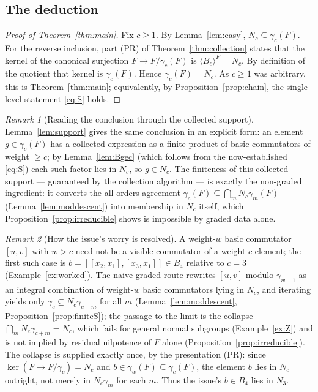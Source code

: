 \documentclass{amsart}
\theoremstyle{definition}
\theoremstyle{remark}
\newtheorem{remark}{Remark}
\begin{document}
\subsection*{The deduction}

\begin{proof}[Proof of Theorem~\ref{thm:main}]
Fix $c\ge1$. By Lemma~\ref{lem:easy}, $N_c\subseteq\gamma_c(F)$. For the reverse inclusion,
part (PR) of Theorem~\ref{thm:collection} states that the kernel of the canonical surjection
$F\to F/\gamma_c(F)$ is $\langle B_c\rangle^F=N_c$. By definition of the quotient that kernel is
$\gamma_c(F)$. Hence $\gamma_c(F)=N_c$. As $c\ge1$ was arbitrary, this is
Theorem~\ref{thm:main}; equivalently, by Proposition~\ref{prop:chain}, the single-level
statement \eqref{eq:S} holds.
\end{proof}

\begin{remark}[Reading the conclusion through the collected support]\label{rem:support-read}
Lemma~\ref{lem:support} gives the same conclusion in an explicit form: an element
$g\in\gamma_c(F)$ has a collected expression as a finite product of basic commutators of weight
$\ge c$; by Lemma~\ref{lem:Bgec} (which follows from the now-established \eqref{eq:S}) each such
factor lies in $N_c$, so $g\in N_c$. The finiteness of this collected support --- guaranteed by
the collection algorithm --- is exactly the non-graded ingredient: it converts the
all-orders agreement $\gamma_c(F)\subseteq\bigcap_m N_c\gamma_m(F)$ (Lemma~\ref{lem:moddescent})
into membership in $N_c$ itself, which Proposition~\ref{prop:irreducible} shows is impossible by
graded data alone.
\end{remark}

\begin{remark}[How the issue's worry is resolved]\label{rem:issue}
A weight-$w$ basic commutator $[u,v]$ with $w>c$ need not be a visible commutator of a
weight-$c$ element; the first such case is $b=[[x_2,x_1],[x_3,x_1]]\in B_4$ relative to
$c=3$ (Example~\ref{ex:worked}). The naive graded route rewrites $[u,v]$ modulo
$\gamma_{w+1}$ as an integral combination of weight-$w$ basic commutators lying in $N_c$, and
iterating yields only $\gamma_c\subseteq N_c\gamma_{c+m}$ for all $m$
(Lemma~\ref{lem:moddescent}, Proposition~\ref{prop:finiteS}); the passage to the limit is the
collapse $\bigcap_m N_c\gamma_{c+m}=N_c$, which fails for general normal subgroups
(Example~\ref{ex:Z}) and is not implied by residual nilpotence of $F$ alone
(Proposition~\ref{prop:irreducible}). The collapse is supplied exactly once, by the
presentation (PR): since $\ker(F\to F/\gamma_c)=N_c$ and $b\in\gamma_w(F)\subseteq\gamma_c(F)$,
the element $b$ lies in $N_c$ outright, not merely in $N_c\gamma_m$ for each $m$. Thus the
issue's $b\in B_4$ lies in $N_3$.
\end{remark}
\end{document}
